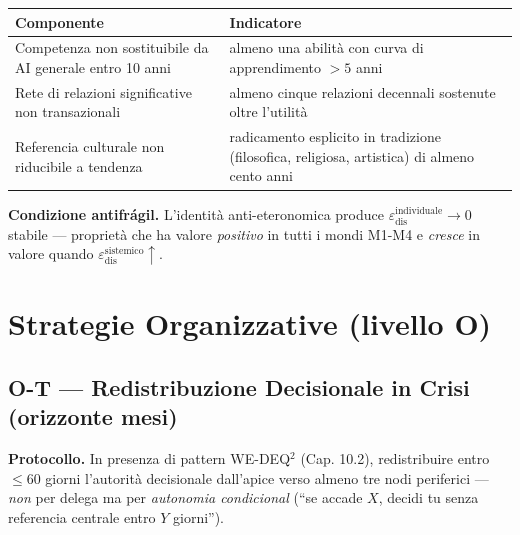 {\def\LTcaptype{none} %
{\small\begin{longtable}[]{@{}
  >{\raggedright\arraybackslash}p{}
  >{\raggedright\arraybackslash}p{}@{}}
\toprule\noalign{}
\begin{minipage}[b]{\linewidth}\raggedright
Componente
\end{minipage} & \begin{minipage}[b]{\linewidth}\raggedright
Indicatore
\end{minipage} \\
\midrule\noalign{}
\endhead
\bottomrule\noalign{}
\endlastfoot
Competenza non sostituibile da AI generale entro 10 anni & almeno una
abilità con curva di apprendimento \(> 5\) anni \\
Rete di relazioni significative non transazionali & almeno cinque
relazioni decennali sostenute oltre l'utilità \\
Referencia culturale non riducibile a tendenza & radicamento esplicito
in tradizione (filosofica, religiosa, artistica) di almeno cento anni \\
\end{longtable}}
}

\Proved{} \textbf{Condizione antifrágil.} L'identità anti-eteronomica
produce \(\varepsilon_{\text{dis}}^{\text{individuale}} \to 0\) stabile
--- proprietà che ha valore \emph{positivo} in tutti i mondi M1-M4 e
\emph{cresce} in valore quando
\(\varepsilon_{\text{dis}}^{\text{sistemico}} \uparrow\).



\section{Strategie Organizzative (livello
O)}\label{strategie-organizzative-livello-o}

\subsection{O-T --- Redistribuzione Decisionale in Crisi (orizzonte
mesi)}\label{o-t-redistribuzione-decisionale-in-crisi-orizzonte-mesi}

\Hypoth{} \textbf{Protocollo.} In presenza di pattern WE-DEQ$^2$ (Cap.
10.2), redistribuire entro \(\leq 60\) giorni l'autorità decisionale
dall'apice verso almeno tre nodi periferici --- \emph{non} per delega ma
per \emph{autonomia condicional} (``se accade \(X\), decidi tu senza
referencia centrale entro \(Y\) giorni'').

